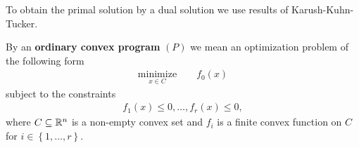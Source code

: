 To obtain the primal solution by a dual solution we use results
of Karush-Kuhn-Tucker.
%
%
%
\begin{definition*}
  \emph{\cite[§28]{Rockafellar1970}}
  By an \textbf{ordinary convex program}
  $(P)$
  we mean an optimization problem of the following form
  \begin{gather*}
    \underset{x\in C}{\mathrm{minimize}}
    \qquad
    f_0(x)
  \end{gather*}
subject to the constraints
\begin{gather}
  f_1(x)\le 0,
  \ldots,
  f_r(x)\le 0,
\end{gather}
where $C\subseteq \mathbb{R}^n$
is a non-empty convex set and
$f_i$ is a finite convex function on $C$ for $i\in \left\{ 1,\ldots,r \right\}$.
\end{definition*}

